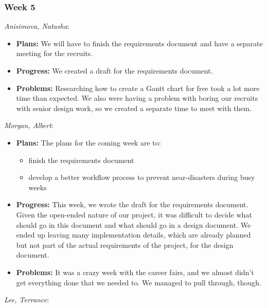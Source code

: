 \documentclass[10pt,draftclsnofoot,onecolumn]{IEEEtran}
\newcommand{\subsubsubsection}[1]{
	\hfill\break\textit{#1}:
}
\begin{document}
\subsubsection{Week 5}
\subsubsubsection{Anisimova, Natasha}
\begin{itemize}
	\item \textbf{Plans: }
	We will have to finish the requirements document and have a separate meeting for the recruits.
	\item \textbf{Progress: }
	We created a draft for the requirements document.
	\item \textbf{Problems: }
	Researching how to create a Gantt chart for free took a lot more time than expected. We also were
	having a problem with boring our recruits with senior design work, so we created a separate time to meet with them.
\end{itemize}
\subsubsubsection{Morgan, Albert}
\begin{itemize}
	\item \textbf{Plans: }
	The plans for the coming week are to:
	\begin{itemize}
		\item finish the requirements document
		\item develop a better workflow process to prevent near-disasters during busy weeks
	\end{itemize}
	\item \textbf{Progress: }
	This week, we wrote the draft for the requirements document. Given the open-ended nature of our project, it was difficult to decide what should go in this document and what should go in a design document. We ended up leaving many implementation details, which are already planned but not part of the actual requirements of the project, for the design document.
	\item \textbf{Problems: }
	It was a crazy week with the career fairs, and we almost didn't get everything done that we needed to. We managed to pull through, though.
\end{itemize}
\subsubsubsection{Lee, Terrance}
\end{document}
